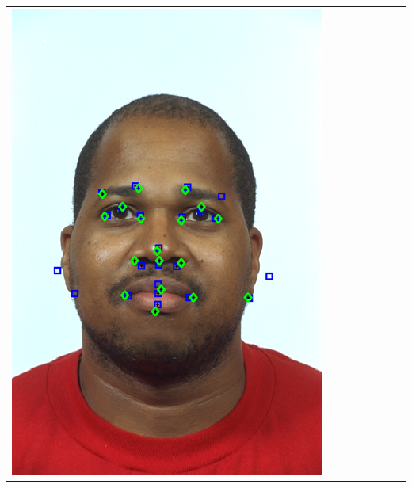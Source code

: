 \documentclass[portrait,final,a0paper,fontscale=0.277]{baposter}
\begin{document}
\begin{poster}
{{\begin{tabular}{@{}rccccccc@{}}
\parbox[c]{0.11\linewidth}{\includegraphics[width=\linewidth]{images/l_fb_success_2.pdf}} &

\end{tabular}}}
\end{poster}
\end{document}
